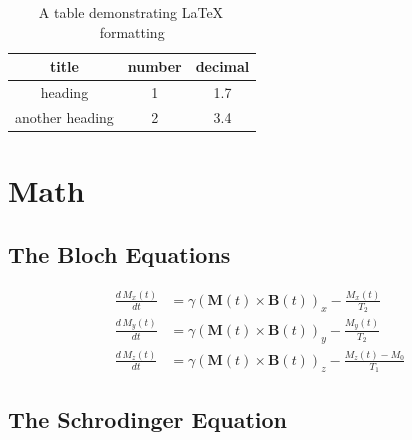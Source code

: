 \documentclass{workreport}
\begin{document}
\begin{body}
\begin{table}
	\centering

	\begin{tabular}{|c|c|c|} \hline
		title & number & decimal \\ \hline
		heading & 1 & 1.7 \\ \hline
		another heading & 2 & 3.4 \\ \hline
	\end{tabular}
	\caption{A table demonstrating \LaTeX \, formatting}

	\label{tbl:exampletable}

\end{table}

\section{Math}

	\lipsum[1]

\subsection{The Bloch Equations}

	\begin{align}
		\frac{d\, M_x(t)}{dt} &= \gamma(\mathbf{M}(t) \times \mathbf{B}(t))_x - \frac{M_x(t)}{T_2} \\
		\frac{d\, M_y(t)}{dt} &= \gamma(\mathbf{M}(t) \times \mathbf{B}(t))_y - \frac{M_y(t)}{T_2} \\
		\frac{d\, M_z(t)}{dt} &= \gamma(\mathbf{M}(t) \times \mathbf{B}(t))_z - \frac{M_z(t) - M_0}{T_1}
	\end{align}

\subsection{The Schrodinger Equation}


\end{body}
\end{document}
